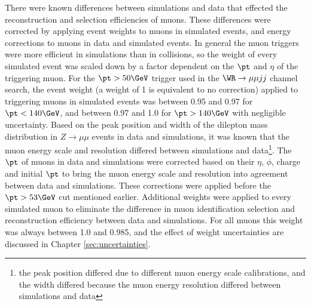 There were known differences between simulations and data that effected the reconstruction and selection efficiencies 
of muons.  These differences were corrected by applying event weights to muons in simulated events, and energy 
corrections to muons in data and simulated events.  In general the muon triggers were more efficient in simulations than in 
collisions, so the weight of every simulated event was scaled down by a factor dependent on the $\pt$ and $\eta$ of the 
triggering muon.  For the $\pt > 50 \GeV$ trigger used in the $\WR \rightarrow \mu\mu jj$ channel search, the 
event weight (a weight of 1 is equivalent to no correction) applied to triggering muons in simulated events was between 
0.95 and 0.97 for $\pt < 140 \GeV$, and between 0.97 and 1.0 for $\pt > 140 \GeV$ with negligible uncertainty.  
Based on the peak position and width of the dilepton mass distribution in $Z \rightarrow \mu\mu$ 
events in data and simulations, it was known that the muon energy scale and resolution differed between simulations 
and data\footnote{the peak position differed due to different muon energy scale calibrations, and the width differed 
because the muon energy resolution differed between simulations and data}.  The $\pt$ of muons in data and simulations 
were corrected based on their $\eta$, $\phi$, charge and initial $\pt$ to bring the muon energy scale and resolution 
into agreement between data and simulations.  These corrections were applied 
before the $\pt > 53 \GeV$ cut mentioned earlier.  Additional weights were applied to every simulated muon 
to eliminate the difference in muon identification selection and reconstruction efficiency between data and simulations.  
For all muons this weight was always between 1.0 and 0.985, and the effect of weight uncertainties are discussed in Chapter 
\ref{sec:uncertainties}.



